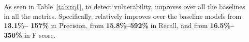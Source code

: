 As seen in Table~\ref{tab:rq1}, to detect vulnerability, {\tool}
improves over all the baselines in all the metrics. Specifically,
{\tool} relatively improves over the baseline models from {\bf 13.1\%--
  157\%} in Precision, from {\bf 15.8\%--592\%} in Recall, and from
{\bf 16.5\%--350\%} in F-score.








